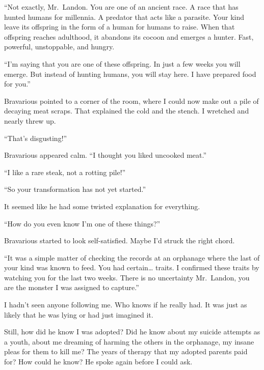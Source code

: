 ``Not exactly, Mr.\ Landon. You are one of an ancient race. A
race that has hunted humans for millennia. A predator that acts
like a parasite. Your kind leave its offspring in the form of a
human for humans to raise. When that offspring reaches adulthood,
it abandons its cocoon and emerges a hunter. Fast, powerful,
unstoppable, and hungry.



``I'm saying that you are one of these offspring. In just a
few weeks you will emerge. But instead of hunting humans, you will
stay here. I have prepared food for you.''



Bravarious pointed to a corner of the room, where I could now make
out a pile of decaying meat scraps. That explained the cold and the
stench. I wretched and nearly threw up.



``That's disgusting!''



Bravarious appeared calm. ``I thought you liked uncooked
meat.''



``I like a rare steak, not a rotting pile!''



``So your transformation has not yet started.''



It seemed like he had some twisted explanation for
everything.



``How do you even know I'm one of these
things?''



Bravarious started to look self-satisfied. Maybe I'd struck
the right chord.



``It was a simple matter of checking the records at an
orphanage where the last of your kind was known to feed. You had
certain{\ldots} traits. I confirmed these traits by watching you
for the last two weeks. There is no uncertainty Mr.\ Landon, you are
the monster I was assigned to capture.''



I hadn't seen anyone following me. Who knows if he really
had. It was just as likely that he was lying or had just imagined
it.



Still, how did he know I was adopted? Did he know about my suicide
attempts as a youth, about me dreaming of harming the others in the
orphanage, my insane pleas for them to kill me? The years of
therapy that my adopted parents paid for? How could he know? He
spoke again before I could ask.



